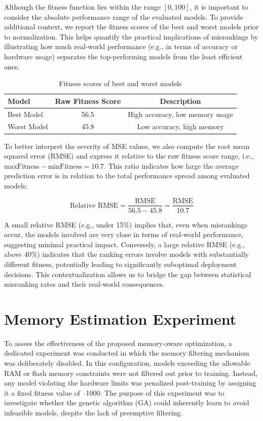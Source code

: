 Although the fitness function lies within the range \([0,100]\), it is important to consider the absolute performance range of the evaluated models. To provide additional context, we report the fitness scores of the best and worst models prior to normalization. This helps quantify the practical implications of misrankings by illustrating how much real-world performance (e.g., in terms of accuracy or hardware usage) separates the top-performing models from the least efficient ones.

\begin{table}[ht]
\centering
\caption{Fitness scores of best and worst models}
\begin{tabular}{lcc}
\toprule
Model & Raw Fitness Score & Description \\
\midrule
Best Model & 56.5 & High accuracy, low memory usage \\
Worst Model & 45.8 & Low accuracy, high memory \\
\bottomrule
\end{tabular}
\end{table}

To better interpret the severity of MSE values, we also compute the root mean squared error (RMSE) and express it relative to the raw fitness score range, i.e., \( \text{maxFitness} - \text{minFitness} = 10.7 \). This ratio indicates how large the average prediction error is in relation to the total performance spread among evaluated models:

\begin{equation}
\text{Relative RMSE} = \frac{\text{RMSE}}{56.5 - 45.8} = \frac{\text{RMSE}}{10.7}
\end{equation}

A small relative RMSE (e.g., under 15\%) implies that, even when misrankings occur, the models involved are very close in terms of real-world performance, suggesting minimal practical impact. Conversely, a large relative RMSE (e.g., above 40\%) indicates that the ranking errors involve models with substantially different fitness, potentially leading to significantly suboptimal deployment decisions. This contextualization allows us to bridge the gap between statistical misranking rates and their real-world consequences.




\section{Memory Estimation Experiment}
\label{sec:memory_estimation_experiment}
To assess the effectiveness of the proposed memory-aware optimization, a dedicated experiment was conducted in which the memory filtering mechanism was deliberately disabled. In this configuration, models exceeding the allowable RAM or flash memory constraints were not filtered out prior to training. Instead, any model violating the hardware limits was penalized post-training by assigning it a fixed fitness value of –1000. The purpose of this experiment was to investigate whether the genetic algorithm (GA) could inherently learn to avoid infeasible models, despite the lack of preemptive filtering.

